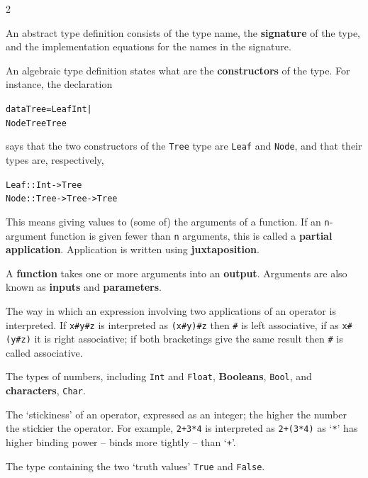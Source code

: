 \begin{multicols}{2}

{\raggedright

An abstract type definition consists of the type name, the \textbf{signature} of
the type, and the implementation equations for the names in the
signature.

An algebraic type definition states what are the \textbf{constructors} of the
type. For instance, the declaration
\begin{alltt}
data Tree = Leaf Int | 
            Node Tree Tree
\end{alltt}
says that the two constructors of the \texttt{Tree} type are
\texttt{Leaf} and \texttt{Node}, and that their types are, respectively,
\begin{alltt}
Leaf :: Int->Tree
Node :: Tree->Tree->Tree
\end{alltt}

This means giving values to (some of) the arguments
of a function. If an \texttt{n}-argument function is given fewer than \texttt{n}
arguments, this is called a \textbf{partial application}.
Application is written using \textbf{juxtaposition}.

A \textbf{function} takes one or more arguments into an \textbf{output}. Arguments
are also known as \textbf{inputs} and \textbf{parameters}.

The way in which an expression involving two applications of an operator is
interpreted. If \texttt{x\#y\#z} is interpreted as \texttt{(x\#y)\#z} then
\texttt{\#} is left associative, if as \texttt{x\#(y\#z)} it is right associative;
if both bracketings give the same result then \texttt{\#} is called associative.

The types of numbers, including
\texttt{Int} and \texttt{Float}, \textbf{Booleans}, \texttt{Bool}, and \textbf{characters},
\texttt{Char}.

The `stickiness' of an operator, expressed as an integer; the higher the
number the stickier the operator. For example, \texttt{2+3*4} is interpreted as
\texttt{2+(3*4)} as `\texttt{*}' has higher binding power -- binds more tightly 
-- than `\texttt{+}'.

The type containing the two `truth values' \texttt{True} and \texttt{False}.

}
\end{multicols}
